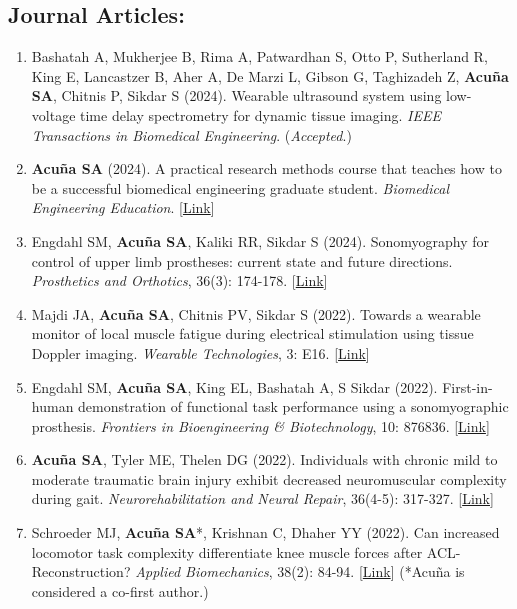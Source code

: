 \documentclass[letterpaper, 10pt]{article}
\begin{document}
\subsection{Journal Articles:}
\begin{enumerate}
    \item Bashatah A, Mukherjee B, Rima A, Patwardhan S, Otto P, Sutherland R, King E, Lancastzer B, Aher A, De Marzi L, Gibson G, Taghizadeh Z, \textbf{Acuña SA}, Chitnis P, Sikdar S (2024). Wearable ultrasound system using low-voltage time delay spectrometry for dynamic tissue imaging. \textit{IEEE Transactions in Biomedical Engineering}.  (\textit{Accepted}.)
    \item \textbf{Acuña SA} (2024). A practical research methods course that teaches how to be a successful biomedical engineering graduate student. \textit{Biomedical Engineering Education}. [\href{https://link.springer.com/article/10.1007/s43683-024-00135-9}{Link}]
    \item Engdahl SM, \textbf{Acuña SA}, Kaliki RR, Sikdar S (2024). Sonomyography for control of upper limb prostheses: current state and future directions. \textit{Prosthetics and Orthotics}, 36(3): 174-178. [\href{https://journals.lww.com/jpojournal/fulltext/2024/07000/sonomyography_for_control_of_upper_limb.6.aspx}{Link}]
    \item Majdi JA, \textbf{Acuña SA}, Chitnis PV, Sikdar S (2022). Towards a wearable monitor of local muscle fatigue during electrical stimulation using tissue Doppler imaging. \textit{Wearable Technologies}, 3: E16. [\href{https://www.cambridge.org/core/journals/wearable-technologies/article/toward-a-wearable-monitor-of-local-muscle-fatigue-during-electrical-muscle-stimulation-using-tissue-doppler-imaging/4ADA49B3A98D245E222D5CCFDE1F180D}{Link}]
    \item Engdahl SM, \textbf{Acuña SA}, King EL, Bashatah A, S Sikdar (2022). First-in-human demonstration of functional task performance using a sonomyographic prosthesis. \textit{Frontiers in Bioengineering \& Biotechnology}, 10: 876836. [\href{https://www.frontiersin.org/articles/10.3389/fbioe.2022.876836/full}{Link}]
    \item \textbf{Acuña SA}, Tyler ME, Thelen DG (2022). Individuals with chronic mild to moderate traumatic brain injury exhibit decreased neuromuscular complexity during gait. \textit{Neurorehabilitation and Neural Repair}, 36(4-5): 317-327. [\href{https://journals.sagepub.com/doi/full/10.1177/15459683221081064}{Link}]
    \item Schroeder MJ, \textbf{Acuña SA}*, Krishnan C, Dhaher YY (2022). Can increased locomotor task complexity differentiate knee muscle forces after ACL-Reconstruction? \textit{Applied Biomechanics}, 38(2): 84-94. [\href{https://journals.humankinetics.com/view/journals/jab/38/2/article-p84.xml}{Link}] (*Acuña is considered a co-ﬁrst author.)

\end{enumerate}
\end{document}
